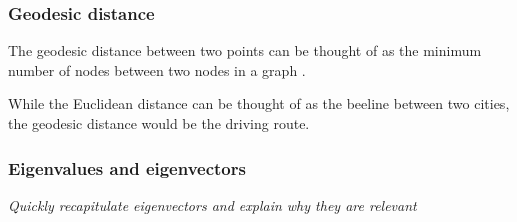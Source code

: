 \noindent
\begin{minipage}[t]{0.45\linewidth}

\subsubsection{Geodesic distance}

The geodesic distance between two points can be thought of as the minimum number of nodes between two nodes in a graph \cite{HandsOnMLCh8}.

\vspace{1mm}

\begin{center}
	\renewcommand{\tikzscale}{0.45}
	
	\vspace*{2mm}
	\captionsetup{justification=centering,type=htypei}
	\label{fig:geodesicdistance}
\end{center}

While the Euclidean distance can be thought of as the beeline between two cities, the geodesic distance would be the driving route.

\end{minipage}\hfill%
\begin{minipage}[t]{0.45\linewidth}

\subsubsection{Eigenvalues and eigenvectors}

\begin{center}
	\textit{Quickly recapitulate eigenvectors and explain why they are relevant}
\end{center}


\end{minipage}%

